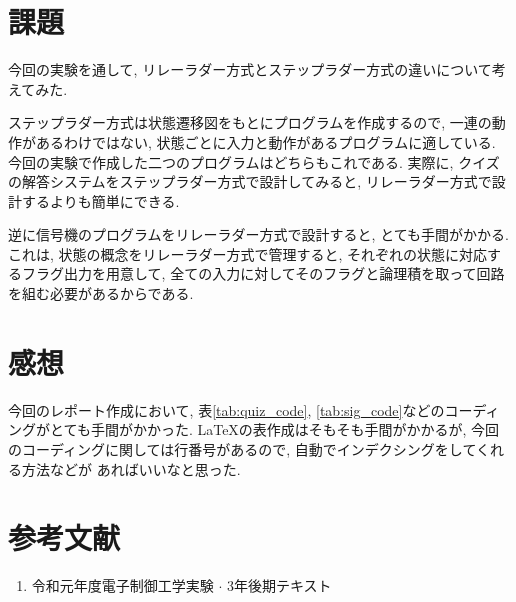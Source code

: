 \documentclass[titlepage]{jsarticle}
\begin{document}
\section{課題}
  今回の実験を通して, リレーラダー方式とステップラダー方式の違いについて考えてみた.

  ステップラダー方式は状態遷移図をもとにプログラムを作成するので,
  一連の動作があるわけではない, 状態ごとに入力と動作があるプログラムに適している.
  今回の実験で作成した二つのプログラムはどちらもこれである.
  実際に, クイズの解答システムをステップラダー方式で設計してみると,
  リレーラダー方式で設計するよりも簡単にできる.

  逆に信号機のプログラムをリレーラダー方式で設計すると,
  とても手間がかかる.
  これは, 状態の概念をリレーラダー方式で管理すると,
  それぞれの状態に対応するフラグ出力を用意して,
  全ての入力に対してそのフラグと論理積を取って回路を組む必要があるからである.
\section{感想}
  今回のレポート作成において,
  表\ref{tab:quiz_code}, \ref{tab:sig_code}などのコーディングがとても手間がかかった.
  \LaTeX の表作成はそもそも手間がかかるが,
  今回のコーディングに関しては行番号があるので, 自動でインデクシングをしてくれる方法などが
  あればいいなと思った.
\section*{参考文献}
  \begin{enumerate}
    \item 令和元年度電子制御工学実験 $\cdot$ 3年後期テキスト
  \end{enumerate}
\end{document}
